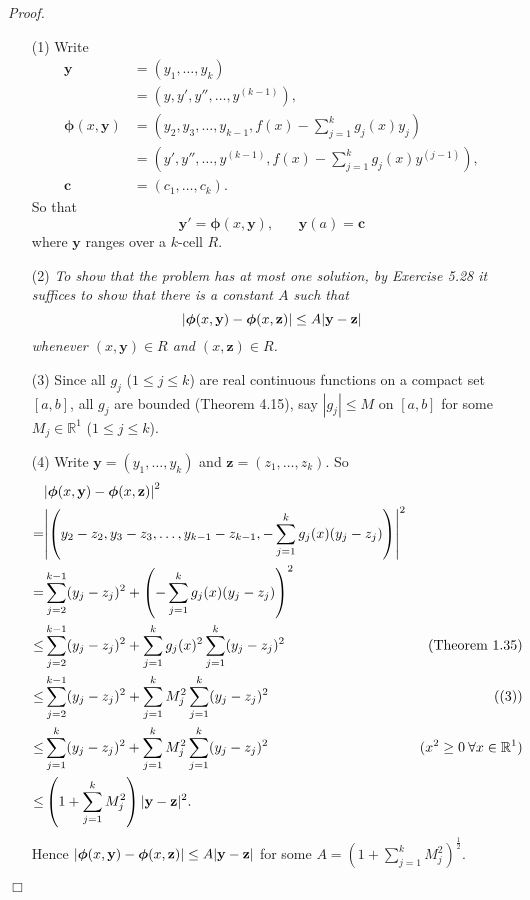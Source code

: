 \documentclass{article}
\begin{document}
\emph{Proof.}
\begin{enumerate}
\item[(1)]
Write
\begin{align*}
  \mathbf{y}
  &= (y_1, \ldots, y_k) \\
  &= \left(y, y', y'', \ldots, y^{(k-1)}\right), \\
  \bm{\phi}(x, \mathbf{y})
  &= \left(y_2, y_3, \ldots, y_{k-1}, f(x) - \sum_{j=1}^{k}{g_j(x)y_j}\right) \\
  &= \left(y', y'', \ldots, y^{(k-1)}, f(x) - \sum_{j=1}^{k}{g_j(x)y^{(j-1)}}\right), \\
  \mathbf{c}
  &= (c_1, \ldots, c_k).
\end{align*}
So that
\[
  \mathbf{y}' = \bm{\phi}(x,\mathbf{y}), \:\:\:\:\:\:\:\:
  \mathbf{y}(a) = \mathbf{c}
\]
where $\mathbf{y}$ ranges over a $k$-cell $R$.

\item[(2)]
\emph{To show that the problem has at most one solution, by Exercise 5.28
it suffices to show that there is a constant $A$ such that
\[
  \abs{ \bm{\phi}(x,\mathbf{y}) - \bm{\phi}(x,\mathbf{z}) }
  \leq A \abs{ \mathbf{y} - \mathbf{z} }
\]
whenever $(x,\mathbf{y}) \in R$ and $(x,\mathbf{z}) \in R$.}

\item[(3)]
Since all $g_j$ ($1 \leq j \leq k$) are real continuous functions on a compact set $[a,b]$,
all $g_j$ are bounded (Theorem 4.15),
say $|g_j| \leq M$ on $[a,b]$ for some $M_j \in \mathbb{R}^1$ ($1 \leq j \leq k$).

\item[(4)]
Write $\mathbf{y} = (y_{1}, \ldots, y_{k})$
and $\mathbf{z} = (z_{1}, \ldots, z_{k})$.
So
\begin{align*}
  &\abs{ \bm{\phi}(x,\mathbf{y}) - \bm{\phi}(x,\mathbf{z}) }^2 \\
  =&
  \abs{ \left(y_{2} - z_{2}, y_{3} - z_{3}, \ldots, y_{k-1} - z_{k-1},
    - \sum_{j=1}^{k}{g_j(x)(y_{j} - z_{j})}\right) }^2 \\
  =&
  \sum_{j=2}^{k-1} (y_{j} - z_{j})^2
    + \left( -\sum_{j=1}^{k}{g_j(x)(y_{j} - z_{j})} \right)^2 \\
  \leq&
  \sum_{j=2}^{k-1} (y_{j} - z_{j})^2
    + \sum_{j=1}^{k} g_j(x)^2 \sum_{j=1}^{k}(y_{j} - z_{j})^2
    &(\text{Theorem 1.35}) \\
  \leq&
  \sum_{j=2}^{k-1} (y_{j} - z_{j})^2
    + \sum_{j=1}^{k} M_j^2 \sum_{j=1}^{k}(y_{j} - z_{j})^2
    &((3)) \\
  \leq&
  \sum_{j=1}^{k} (y_{j} - z_{j})^2
    + \sum_{j=1}^{k} M_j^2 \sum_{j=1}^{k}(y_{j} - z_{j})^2
    &(x^2 \geq 0 \: \forall x \in \mathbb{R}^1) \\
  \leq&
   \left( 1 + \sum_{j=1}^{k} M_j^2 \right) |\mathbf{y} - \mathbf{z}|^2.
\end{align*}
Hence
$\abs{ \bm{\phi}(x,\mathbf{y}) - \bm{\phi}(x,\mathbf{z}) }
\leq A \abs{ \mathbf{y} - \mathbf{z} }$
for some $A = \left( 1 + \sum_{j=1}^{k} M_j^2 \right)^{\frac{1}{2}}$.
\end{enumerate}
$\Box$ \\\\



\end{document}
